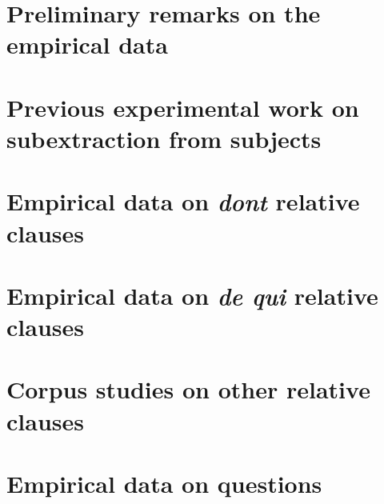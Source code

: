 \chapter{Preliminary remarks on the empirical data}


\chapter{Previous experimental work on subextraction from subjects}



\chapter{Empirical data on \emph{dont} relative clauses}







\chapter{Empirical data on \emph{de qui} relative clauses}








\chapter{Corpus studies on other relative clauses}




\chapter{Empirical data on questions}









